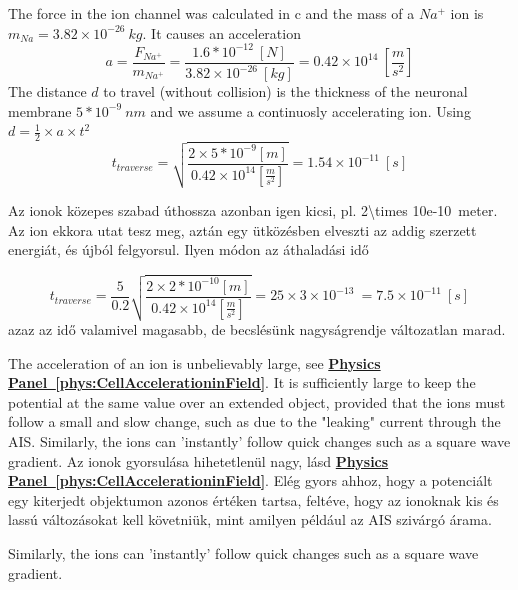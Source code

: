 {
The force in the ion channel was calculated in
c\noindent
and the mass of a $Na^+$ ion is $m_{Na} = 3.82\times 10^{-26}\ kg$.
It causes an acceleration
\begin{equation}
a=\frac{F_{Na^+}}{m_{Na^+}} = \frac{1.6*10^{-12}\ [N]}{ 3.82\times 10^{-26}\ [kg]} =
0.42 \times 10^{14}\ [\frac{m}{s^{2}}]
\label{eq:Physics-RushInAceleration}
\end{equation}
\noindent
The distance $d$ to travel (without collision) is the thickness of the neuronal membrane $5*10^{-9}\ nm$
and we assume a continuosly accelerating ion. Using $d=\frac{1}{2}\times a\times t^2$
\begin{equation}
t_{traverse} = \sqrt{\frac{2\times 5*10^{-9} [m]}{0.42\times 10^{14} [\frac{m}{s^{2}}]}} = 1.54\times 10^{-11}\ [s]
\end{equation}

Az ionok közepes szabad úthossza azonban igen kicsi,
pl. \SI{2\times 10e-10}{meter}. Az ion ekkora utat tesz meg, aztán egy ütközésben elveszti az addig szerzett
energiát, és újból felgyorsul. Ilyen módon az áthaladási idő

\begin{equation}
t_{traverse} = \frac{5}{0.2}\sqrt{\frac{2\times 2*10^{-10} [m]}{0.42\times 10^{14} [\frac{m}{s^{2}}]}} = 25\times 3\times 10^{-13}\ = 7.5\times 10^{-11}\ [s]
\end{equation}
azaz az idő valamivel magasabb, de becslésünk nagyságrendje változatlan marad.
}
\fi


\ifx\magyar\undefined
The acceleration of an ion is unbelievably large,
see \textbf{\hyperlink{phys:CellAccelerationinField}{Physics Panel~\ref{phys:CellAccelerationinField}}}.
It is sufficiently large to keep the potential at the same value
over an extended object,
provided that the ions must follow a small and slow change, such as due to the
"leaking" current through the
\gls{AIS}.
Similarly, the ions can 'instantly' follow quick changes such as
a square wave gradient.
%
\else
%
Az ionok gyorsulása hihetetlenül nagy, lásd 
\textbf{\hyperlink{phys:CellAccelerationinField}{Physics Panel~\ref{phys:CellAccelerationinField}}}.
Elég gyors ahhoz, hogy a potenciált egy kiterjedt objektumon azonos értéken tartsa,
feltéve, hogy az ionoknak kis és lassú változásokat kell követniük, mint amilyen például az \gls{AIS}
szivárgó árama.

Similarly, the ions can 'instantly' follow quick changes such as
a square wave gradient.
\fi

